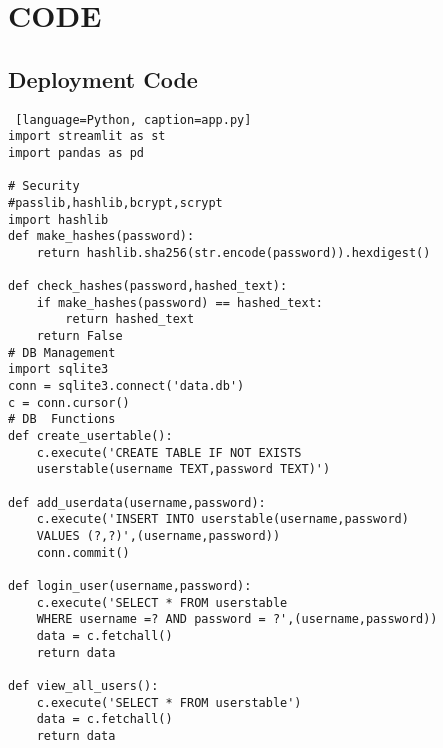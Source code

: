 \chapter{CODE}
\label{appendix_0}
\graphicspath{{100_Appendices/}}

\section{Deployment Code}
\begin{lstlisting} [language=Python, caption=app.py]
import streamlit as st
import pandas as pd

# Security
#passlib,hashlib,bcrypt,scrypt
import hashlib
def make_hashes(password):
    return hashlib.sha256(str.encode(password)).hexdigest()

def check_hashes(password,hashed_text):
    if make_hashes(password) == hashed_text:
        return hashed_text
    return False
# DB Management
import sqlite3 
conn = sqlite3.connect('data.db')
c = conn.cursor()
# DB  Functions
def create_usertable():
    c.execute('CREATE TABLE IF NOT EXISTS 
    userstable(username TEXT,password TEXT)')

def add_userdata(username,password):
    c.execute('INSERT INTO userstable(username,password) 
    VALUES (?,?)',(username,password))
    conn.commit()

def login_user(username,password):
    c.execute('SELECT * FROM userstable 
    WHERE username =? AND password = ?',(username,password))
    data = c.fetchall()
    return data

def view_all_users():
    c.execute('SELECT * FROM userstable')
    data = c.fetchall()
    return data


\end{lstlisting}
